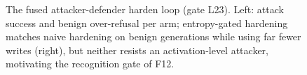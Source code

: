 \begin{figure}[t]
\centering
\resizebox{\columnwidth}{!}{}
\caption{The fused attacker-defender harden loop (gate L23). Left: attack success and benign over-refusal per arm; entropy-gated hardening matches naive hardening on benign generations while using far fewer writes (right), but neither resists an activation-level attacker, motivating the recognition gate of F12.}
\label{fig:harden}
\end{figure}

